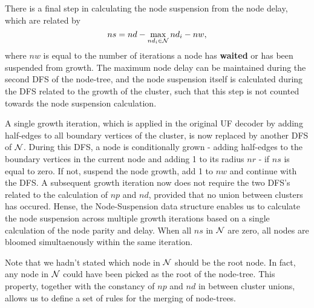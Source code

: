 There is a final step in calculating the node suspension from the node delay, which are related by
\begin{equation}\label{eq:suspension}
    ns = nd - \max_{nd_i \in \nset} nd_i - nw, 
\end{equation}
where $nw$ is equal to the number of iterations a node has \textbf{waited} or has been suspended from growth. The maximum node delay can be maintained during the second DFS of the node-tree, and the node suspension itself is calculated during the DFS related to the growth of the cluster, such that this step is not counted towards the node suspension calculation. 

A single growth iteration, which is applied in the original UF decoder by adding half-edges to all boundary vertices of the cluster, is now replaced by another DFS of $\mathcal{N}$. During this DFS, a node is conditionally grown - adding half-edges to the boundary vertices in the current node and adding 1 to its radius $nr$ - if $ns$ is equal to zero. If not, suspend the node growth, add 1 to $nw$ and continue with the DFS. A subsequent growth iteration now does not require the two DFS's related to the calculation of $np$ and $nd$, provided that no union between clusters has occured. Hense, the Node-Suspension data structure enables us to calculate the node suspension across multiple growth iterations based on a single calculation of the node parity and delay. When all $ns$ in $\mathcal{N}$ are zero, all nodes are bloomed simultaenously within the same iteration. 

Note that we hadn't stated which node in $\mathcal{N}$ should be the root node. In fact, any node in $\mathcal{N}$ could have been picked as the root of the node-tree. This property, together with the constancy of $np$ and $nd$ in between cluster unions, allows us to define a set of rules for the merging of node-trees.  